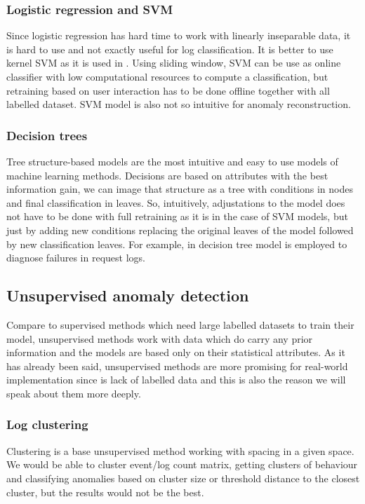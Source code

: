 \subsubsection{Logistic regression and SVM}

Since logistic regression has hard time to work with linearly inseparable data, it is hard to use and not exactly useful for log classification. It is better to use kernel SVM as it is used in \cite{liang2007failure}.  Using sliding window, SVM can be use as online classifier with low computational resources to compute a classification, but retraining based on user interaction has to be done offline together with all labelled dataset. SVM model is also not so intuitive for anomaly reconstruction. 
\subsubsection{Decision trees}
Tree structure-based models are the most intuitive and easy to use models of machine learning methods. Decisions are based on attributes with the best information gain, we can image that  structure as a tree with conditions in nodes and final classification in leaves. So, intuitively, adjustations to the model does not have to be done with full retraining as it is in the case of SVM models, but just by adding new conditions replacing the original leaves of the model followed by new classification leaves. For example, in \cite{chen2004failure}  decision tree model is employed to diagnose failures in request logs.
\subsection{Unsupervised anomaly detection}

Compare to supervised methods which need large labelled datasets to train their model, unsupervised methods work with data which do carry any prior information and the models are based only on their statistical attributes. As it has already been said, unsupervised methods are more promising for real-world implementation since  is lack of labelled data and this is also the reason we will speak about them more deeply. 

\subsubsection{Log clustering}

Clustering is a base unsupervised method working with spacing in a given space. We would be able to cluster event/log count matrix, getting clusters of behaviour and classifying anomalies based on cluster size or threshold distance to the closest cluster, but the results would not be the best.

